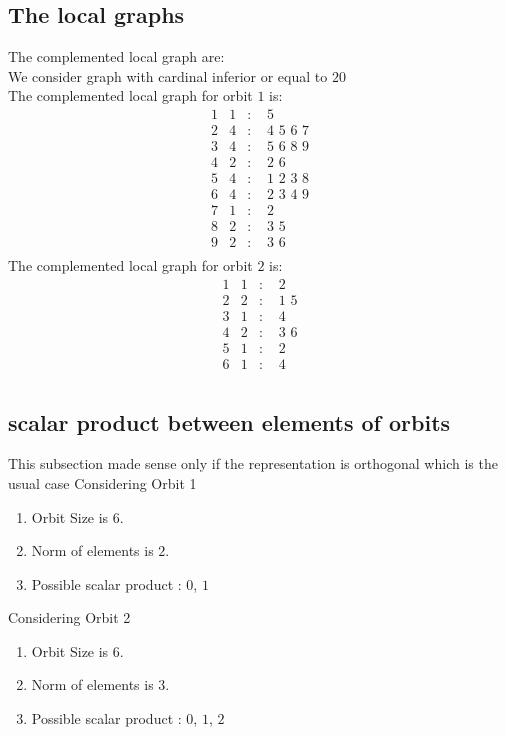 \documentclass[12pt]{article}
\begin{document}
\subsection{The local graphs}
The complemented local graph are:\\
We consider graph with cardinal inferior or equal to $20$\\
The complemented local graph for orbit $1$ is:
\begin{equation*}
\begin{array}{rrcl}
1&1&:&\,\,5\\
2&4&:&\,\,4\,\,5\,\,6\,\,7\\
3&4&:&\,\,5\,\,6\,\,8\,\,9\\
4&2&:&\,\,2\,\,6\\
5&4&:&\,\,1\,\,2\,\,3\,\,8\\
6&4&:&\,\,2\,\,3\,\,4\,\,9\\
7&1&:&\,\,2\\
8&2&:&\,\,3\,\,5\\
9&2&:&\,\,3\,\,6\\
\end{array}
\end{equation*}
The complemented local graph for orbit $2$ is:
\begin{equation*}
\begin{array}{rrcl}
1&1&:&\,\,2\\
2&2&:&\,\,1\,\,5\\
3&1&:&\,\,4\\
4&2&:&\,\,3\,\,6\\
5&1&:&\,\,2\\
6&1&:&\,\,4\\
\end{array}
\end{equation*}
\subsection{scalar product between elements of orbits}
\noindent This subsection made sense only if the representation is orthogonal which is the usual case
Considering Orbit 1
\begin{enumerate}
\item Orbit Size is $6$.
\item Norm of elements is $2$.
\item Possible scalar product : $0$, $1$
\end{enumerate}
Considering Orbit 2
\begin{enumerate}
\item Orbit Size is $6$.
\item Norm of elements is $3$.
\item Possible scalar product : $0$, $1$, $2$
\end{enumerate}
\end{document}
